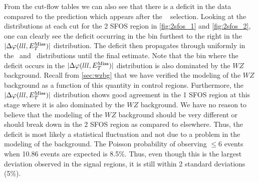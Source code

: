 From the cut-flow tables we can also see that there is a deficit in the data
compared to the prediction which appears after the \deltaphi~
selection. Looking at the distributions at each cut for 
the 2 SFOS region in 
\fig\ref{fig:2sfos_1} and \fig\ref{fig:2sfos_2},
one can clearly see the deficit occurring in the bin
furthest to the right in the $|\Delta\varphi(lll,E_{T}^{\textrm{Miss}})|$ distribution.
The deficit then propagates through uniformly in the 
\njet~and \nmu~distributions until the final estimate.
Note that the bin where the deficit occurs in the $|\Delta\varphi(lll,E_{T}^{\textrm{Miss}})|$
distribution is also dominated by the $WZ$ background.
Recall from \sec\ref{sec:wzbg} that 
we have verified the modeling of the $WZ$ background
as a function of this quantity in control regions. 
Furthermore, the $|\Delta\varphi(lll,E_{T}^{\textrm{Miss}})|$ distribution
shows good agreement in the 1 SFOS region at this stage
where it is also dominated by the $WZ$ background.
We have no reason to believe that the modeling of the $WZ$
background should be very different or should 
break down in the 2 SFOS region as compared to elsewhere.
Thus, the deficit is most likely a statistical fluctuation
and not due to a problem in the modeling of the 
background.
The Poisson probability of observing $\leq 6$ events
when 10.86 events are expected is 8.5\%.
Thus, even though this is the largest deviation observed in the signal
regions, it is still within 2 standard deviations (5\%).


\FloatBarrier
